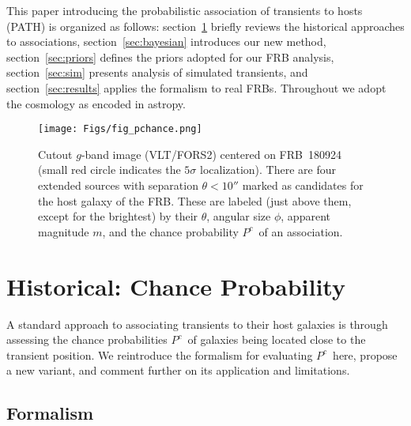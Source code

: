 \documentclass[twocolumn,linenumbers]{aastex63}
\newcommand{\mhalflight}{\phi} %
\newcommand{\halflight}{$\mhalflight$}
\newcommand{\mpchance}{P^c}
\newcommand{\pchance}{$\mpchance$}
\newcommand{\stcomment}[1]{\footnote{[SPT comment: {\color{purple} #1 }]}} %
\begin{document}
This paper introducing the probabilistic association of
transients to hosts (PATH) is organized as follows:
section~\ref{sec:chance} briefly reviews the historical approaches
to associations, section~\ref{sec:bayesian} introduces our
new method, section~\ref{sec:priors} defines the priors adopted
for our FRB analysis, section~\ref{sec:sim} presents analysis
of simulated transients, and section~\ref{sec:results} 
applies the formalism to real FRBs.
Throughout we adopt the \cite{Planck15} cosmology as
encoded in {\sc astropy}.


\begin{figure}[!ht]
\centering
    \texttt{[image: Figs/fig\_pchance.png]}
    \caption{
    Cutout $g$-band image (VLT/FORS2) centered on FRB~180924
    (small red circle indicates the $5\sigma$ localization).  There are four extended sources with
    separation $\theta < 10''$ marked as candidates for the
    host galaxy of the FRB.
    These are labeled (just above them, 
    except for the brightest)
    by their $\theta$, angular size
    \halflight, apparent magnitude $m$, and the chance
    probability \pchance\ of an association.
    }
	\label{fig:chance}
\end{figure}

\section{Historical: Chance Probability} \label{sec:chance}

A standard approach to associating transients to their
host galaxies is through assessing the chance 
probabilities \pchance\ of galaxies 
being located close to the transient position.
We reintroduce the formalism for evaluating \pchance\ here,
propose a new variant, and comment further 
on its application and limitations.

\subsection{Formalism}
\end{document}
